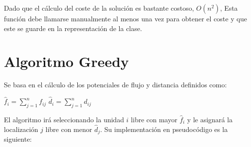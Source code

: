 \documentclass[a4paper, 12pt]{article}
\begin{document}
   Dado que el cálculo del coste de la solución es bastante costoso, $O(n^{2})$, Esta función debe llamarse manualmente al menos una vez para obtener el coste y que este se guarde en la representación de la clase.
   
   
   \newpage
   \section{Algoritmo Greedy}
   Se basa en el cálculo de los potenciales de flujo y distancia definidos como:
   \begin{center}
      $\hat{f}_i = \sum_{j=1}^{n}f_{ij}$ \hspace*{1cm} $\hat{d}_i = \sum_{j=1}^{n}d_{ij}$
   \end{center}
   
   El algoritmo irá seleccionando la unidad $i$ libre con mayor $\hat{f}_i$ y le asignará la localización $j$ libre con menor $\hat{d}_j$. Su implementación en pseudocódigo es la siguiente:  
\end{document}

